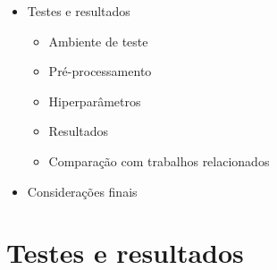 \documentclass[10pt]{beamer}
\begin{document}
\begin{frame}
\begin{itemize}
    
    \item Testes e resultados
    \begin{itemize}
      \item[\ ] Ambiente de teste
      \item[\ ] Pré-processamento
      \item[\ ] Hiperparâmetros
      \item[\ ] Resultados
      \item[\ ] Comparação com trabalhos relacionados
    \end{itemize}

    \color{gray}
    \item[\color{gray}{$\bullet$}] Considerações finais

  \end{itemize}

\end{frame}











\section{Testes e resultados}
\end{document}
